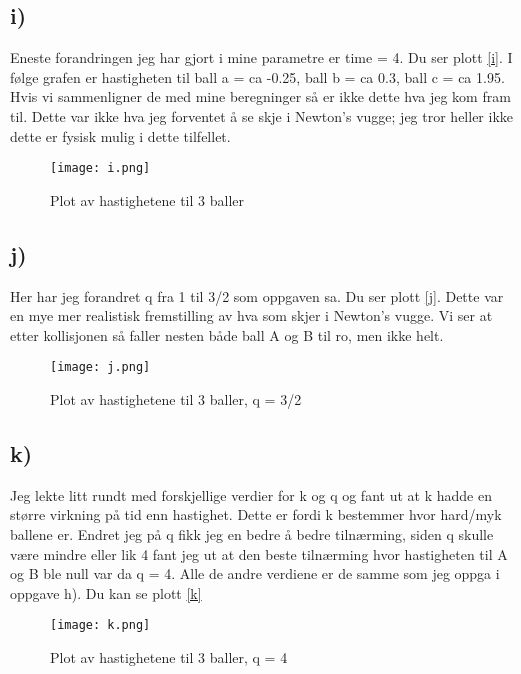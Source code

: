 \documentclass[a4paper,12pt,norsk]{article}
\begin{document}
\subsection*{i)}
Eneste forandringen jeg har gjort i mine parametre er time = 4. Du ser plott \vref{i}. I følge grafen er hastigheten til ball a = ca -0.25, ball b = ca 0.3, ball c = ca 1.95. Hvis vi sammenligner de med mine beregninger så er ikke dette hva jeg kom fram til. Dette var ikke hva jeg forventet å se skje i Newton's vugge; jeg tror heller ikke dette er fysisk mulig i dette tilfellet.
\begin{figure}[h!]
\texttt{[image: i.png]} 
\caption{Plot av hastighetene til 3 baller}
\label{i}
\end{figure}

\subsection*{j)}
Her har jeg forandret q fra 1 til 3/2 som oppgaven sa. Du ser plott \vref{j}. Dette var en mye mer realistisk fremstilling av hva som skjer i Newton's vugge.  Vi ser at etter kollisjonen så faller nesten både ball A og B til ro, men ikke helt. 
\begin{figure}[h!]
\texttt{[image: j.png]} 
\caption{Plot av hastighetene til 3 baller, q = 3/2}
\label{j}
\end{figure}

\subsection*{k)}
Jeg lekte litt rundt med forskjellige verdier for k og q og fant ut at k hadde en større virkning på tid enn hastighet. Dette er fordi k bestemmer hvor hard/myk ballene er. Endret jeg på q fikk jeg en bedre å bedre tilnærming, siden q skulle være mindre eller lik 4 fant jeg ut at den beste tilnærming hvor hastigheten til A og B ble null var da q = 4. Alle de andre verdiene er de samme som jeg oppga i oppgave h). Du kan se plott \vref{k} 

\begin{figure}[h!]
\texttt{[image: k.png]} 
\caption{Plot av hastighetene til 3 baller, q = 4}
\label{k}
\end{figure}
\end{document}
